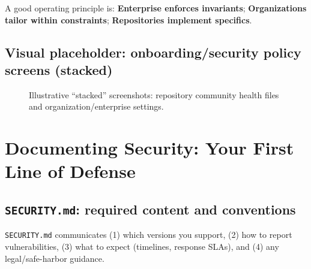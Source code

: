 \documentclass[11pt]{article}
\begin{document}
\begin{notebox}
A good operating principle is: \textbf{Enterprise enforces invariants}; \textbf{Organizations tailor within constraints}; \textbf{Repositories implement specifics}.
\end{notebox}

\subsection{Visual placeholder: onboarding/security policy screens (stacked)}
\begin{figure}[h!]
\centering
{}
\caption{Illustrative ``stacked'' screenshots: repository community health files and organization/enterprise settings.}
\end{figure}

\section{Documenting Security: Your First Line of Defense}

\subsection{\texttt{SECURITY.md}: required content and conventions}
\texttt{SECURITY.md} communicates (1) which versions you support, (2) how to report vulnerabilities, (3) what to expect (timelines, response SLAs), and (4) any legal/safe-harbor guidance.
\end{document}
